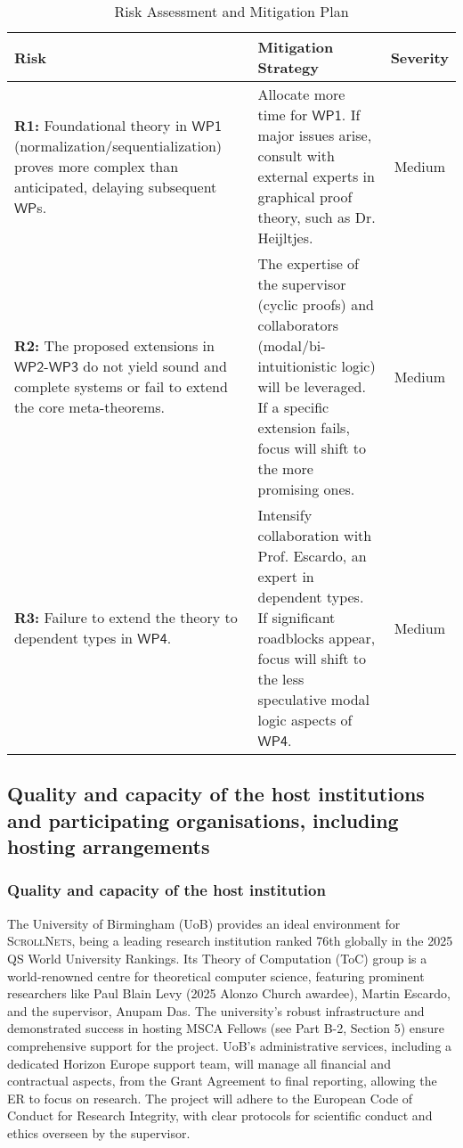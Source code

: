 \documentclass[11pt]{msca-pf}
\newcommand{\proj}{\small\textsc{ScrollNets}}
\newcommand{\WP}[1]{$\mathsf{WP#1}$}
\begin{document}
\begin{table}[h!]
\centering
\fontsize{11pt}{10pt}\selectfont
\caption{Risk Assessment and Mitigation Plan}
\begin{tabular}{p{} p{} c}
\toprule
\textbf{Risk} & \textbf{Mitigation Strategy} & \textbf{Severity} \\
\midrule
\textbf{R1:} Foundational theory in \WP{1} (normalization/sequentialization) proves more complex than anticipated, delaying subsequent $\mathsf{WP}$s. & Allocate more time for \WP{1}. If major issues arise, consult with external experts in graphical proof theory, such as Dr. Heijltjes. & Medium \\
\addlinespace
\textbf{R2:} The proposed extensions in \WP{2}-\WP{3} do not yield sound and complete systems or fail to extend the core meta-theorems. & The expertise of the supervisor (cyclic proofs) and collaborators (modal/bi-intuitionistic logic) will be leveraged. If a specific extension fails, focus will shift to the more promising ones. & Medium \\
\addlinespace
\textbf{R3:} Failure to extend the theory to dependent types in \WP{4}. & Intensify collaboration with Prof. Escardo, an expert in dependent types. If significant roadblocks appear, focus will shift to the less speculative modal logic aspects of \WP{4}. & Medium \\
\bottomrule
\end{tabular}
\label{tbl:risks}
\end{table}

\subsection{Quality and capacity of the host institutions and participating
organisations, including hosting arrangements}
\label{ssc:implementation:host}

\subsubsection{Quality and capacity of the host institution}

The University of Birmingham (UoB) provides an ideal environment for {\proj}, being a leading
research institution ranked 76th globally in the 2025 QS World University Rankings. Its Theory of
Computation (ToC) group is a world-renowned centre for theoretical computer science, featuring
prominent researchers like Paul Blain Levy (2025 Alonzo Church awardee), Martin Escardo, and the
supervisor, Anupam Das. The university's robust infrastructure and demonstrated success in hosting
MSCA Fellows (see Part B-2, Section 5) ensure comprehensive support for the project. UoB's
administrative services, including a dedicated Horizon Europe support team, will manage all
financial and contractual aspects, from the Grant Agreement to final reporting, allowing the ER to
focus on research. The project will adhere to the European Code of Conduct for Research Integrity,
with clear protocols for scientific conduct and ethics overseen by the supervisor.
\end{document}
